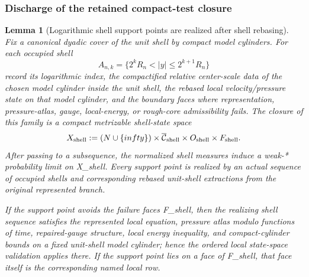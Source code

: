 \documentclass[11pt]{amsart}
\def\({}%
\def\){}%
\def\mathfrak#1{#1}%
\def\mathbb#1{#1}%
\def\infty{infty}%
\theoremstyle{plain}
\newtheorem{lemma}[lemma]{Lemma}
\theoremstyle{definition}
\theoremstyle{remark}
\begin{document}
\subsubsection*{Discharge of the retained compact-test closure}
\label{paper6a:subsec:discharge-retained-compact-tests}

\begin{lemma}[Logarithmic shell support points are realized after shell rebasing]
\label{paper9:lem:logarithmic-tail-shell-realization}
Fix a canonical dyadic cover of the unit shell by compact model cylinders.  For
each occupied shell
\[
  A_{n,k}=\{2^kR_n<|y|\le 2^{k+1}R_n\}
\]
record its logarithmic index, the compactified relative center-scale data of the
chosen model cylinder inside the unit shell, the rebased local velocity/pressure
state on that model cylinder, and the boundary faces where representation,
pressure-atlas, gauge, local-energy, or rough-core admissibility fails.  The
closure of this family is a compact metrizable shell-state space
\[
  \mathfrak X_{\rm shell}
  :=
  (\mathbb N\cup\{\infty\})
  \times \overline{\mathcal C}_{\rm shell}
  \times \mathfrak O_{\rm shell}
  \times \mathfrak F_{\rm shell}.
\]
After passing to a subsequence, the normalized shell measures induce a weak-*
probability limit on \(\mathfrak X_{\rm shell}\).  Every support point is
realized by an actual sequence of occupied shells and corresponding rebased
unit-shell extractions from the original represented branch.

If the support point avoids the failure faces \(\mathfrak F_{\rm shell}\), then
the realizing shell sequence satisfies the represented local equation, pressure
atlas modulo functions of time, repaired-gauge structure, local energy
inequality, and compact-cylinder bounds on a fixed unit-shell model cylinder;
hence the ordered local state-space validation applies there.  If the support
point lies on a face of \(\mathfrak F_{\rm shell}\), that face itself is the
corresponding named local row.
\end{lemma}
\end{document}
